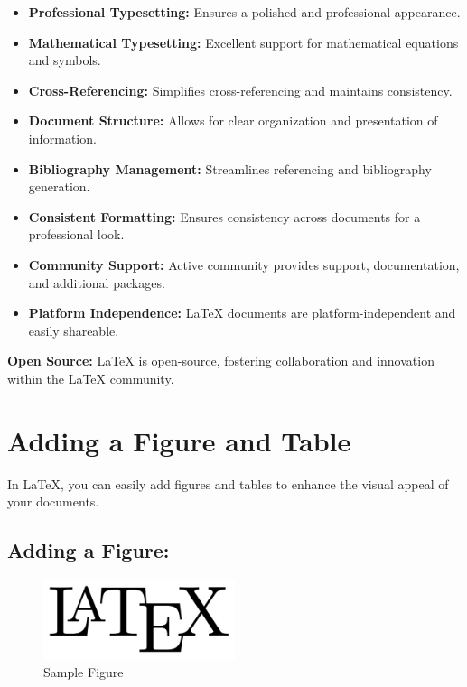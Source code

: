 \documentclass[11pt]{article}
\begin{document}
\begin{itemize}
  \item \textbf{Professional Typesetting:} Ensures a polished and professional appearance.
  
  \item \textbf{Mathematical Typesetting:} Excellent support for mathematical equations and symbols.
  
  \item \textbf{Cross-Referencing:} Simplifies cross-referencing and maintains consistency.
  
  \item \textbf{Document Structure:} Allows for clear organization and presentation of information.
  
  \item \textbf{Bibliography Management:} Streamlines referencing and bibliography generation.
  
  \item \textbf{Consistent Formatting:} Ensures consistency across documents for a professional look.
  
  \item \textbf{Community Support:} Active community provides support, documentation, and additional packages.
  
  \item \textbf{Platform Independence:} LaTeX documents are platform-independent and easily shareable.
\end{itemize}

\textbf{Open Source:} LaTeX is open-source, fostering collaboration and innovation within the LaTeX community.

\newpage

\section{\LARGE Adding a Figure and Table}
In LaTeX, you can easily add figures and tables to enhance the visual appeal of your documents.
\\
\subsection{\large Adding a Figure:}



\begin{figure}[ht]
    \centering
    \includegraphics[width=0.5\textwidth]{image.png}
    \caption{Sample Figure}
    \label{fig:latex-logo}
\end{figure}
\end{document}
